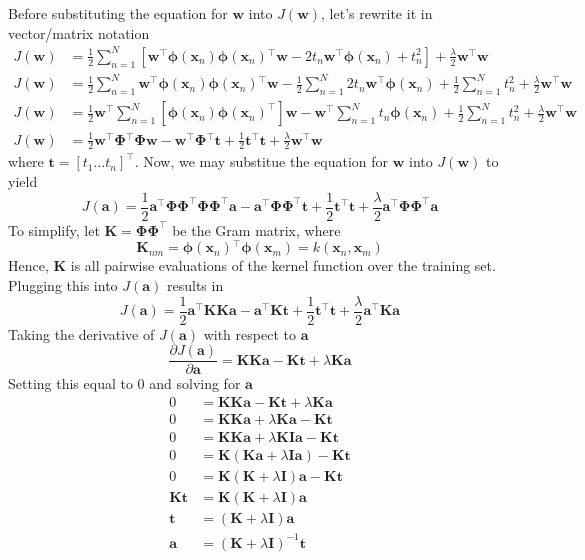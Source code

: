 \documentclass[12pt]{article}
\newcommand{\w}{\mathbf{w}}
\newcommand{\tVec}{\mathbf{t}}
\newcommand{\aVec}{\mathbf{a}}
\newcommand{\sumN}{\sum \limits_{n=1}^N}
\newcommand{\Ja}{J\left(\aVec{}\right)}
\newcommand{\Jw}{J\left(\w{}\right)}
\newcommand{\wTransW}{\w{}^\top\w{}}
\newcommand{\tTransT}{\tVec{}^\top\tVec{}}
\newcommand{\dJda}{\frac{\partial \Ja{}}{\partial \aVec{}}}
\newcommand{\phiXn}{\mathbf{\phi}\left(\mathbf{x}_n\right)}
\newcommand{\phiXm}{\mathbf{\phi}\left(\mathbf{x}_m\right)}
\newcommand{\wTransPhi}{\w{}^\top\phiXn{}}
\newcommand{\phiTransW}{\phiXn{}^\top\w{}}
\newcommand{\PhiMat}{\mathbf{\Phi}}
\newcommand{\PhiPhiTrans}{\PhiMat\PhiMat^\top}
\newcommand{\K}{\mathbf{K}}
\newcommand{\I}{\mathbf{I}}
\begin{document}
Before substituting the equation for $\w{}$ into $\Jw{}$, let's rewrite it in
vector/matrix notation
%
\begin{align*}
  \Jw{} &= \frac{1}{2}\sumN{}
  \left[\wTransPhi{}\phiTransW{} - 2t_n\wTransPhi{} + t_n^2\right] +
  \frac{\lambda}{2}\wTransW{}\\
  \Jw{} &= \frac{1}{2}\sumN{}\wTransPhi{}\phiTransW{} -
  \frac{1}{2}\sumN{}2t_n\wTransPhi{} +
  \frac{1}{2}\sumN{}t_n^2 +
  \frac{\lambda}{2}\wTransW{}\\
  \Jw{} &= \frac{1}{2}\w{}^\top\sumN{}\left[\phiXn{}\phiXn^\top\right]\w{} -
  \w{}^\top\sumN{}t_n\phiXn{} +
  \frac{1}{2}\sumN{}t_n^2 +
  \frac{\lambda}{2}\wTransW{}\\
  \Jw{} &= \frac{1}{2}\w{}^\top\PhiMat{}^\top\PhiMat{}\w{} -
  \w{}^\top\PhiMat{}^\top\tVec{} +
  \frac{1}{2}\tTransT{} +
  \frac{\lambda}{2}\wTransW{}
\end{align*}
%
where $\tVec{} = \left[t_1 \hdots t_n\right]^\top$. Now, we may substitue the
equation for $\w{}$ into $\Jw{}$ to yield
%
\begin{equation*}
\Ja{} = \frac{1}{2}\aVec{}^\top\PhiPhiTrans{}\PhiPhiTrans{}\aVec{} -
  \aVec{}^\top\PhiPhiTrans{}\tVec{} +
  \frac{1}{2}\tTransT{} +
  \frac{\lambda}{2}\aVec{}^\top\PhiPhiTrans{}\aVec{}
\end{equation*}
%
To simplify, let $\K{} = \PhiPhiTrans{}$ be the Gram matrix, where
%
\begin{equation*}
\K{}_{nm} = \phiXn{}^\top\phiXm{} = k\left(\mathbf{x}_n,\mathbf{x}_m\right)
\end{equation*}
%
Hence, $\K{}$ is all pairwise evaluations of the kernel function over the
training set. Plugging this into $\Ja{}$ results in
%
\begin{equation*}
  \Ja{} = \frac{1}{2}\aVec{}^\top\K{}\K{}\aVec{} -
  \aVec{}^\top\K{}\tVec{} +
  \frac{1}{2}\tTransT{} +
  \frac{\lambda}{2}\aVec{}^\top\K{}\aVec{}
\end{equation*}
%
Taking the derivative of $\Ja{}$ with respect to $\aVec{}$
\begin{equation*}
  \dJda = \K{}\K{}\aVec{} - \K{}\tVec{} + \lambda\K{}\aVec{}
\end{equation*}
%
Setting this equal to $0$ and solving for $\aVec{}$
\begin{align*}
  0 &= \K{}\K{}\aVec{} - \K{}\tVec{} + \lambda\K{}\aVec{}\\
  0 &= \K{}\K{}\aVec{} + \lambda\K{}\aVec{} - \K{}\tVec{}\\
  0 &= \K{}\K{}\aVec{} + \lambda\K{}\I{}\aVec{} - \K{}\tVec{}\\
  0 &= \K{}\left(\K{}\aVec{} + \lambda\I{}\aVec{}\right) - \K{}\tVec{}\\
  0 &= \K{}\left(\K{} + \lambda\I{}\right)\aVec{} - \K{}\tVec{}\\
  \K{}\tVec{} &= \K{}\left(\K{} + \lambda\I{}\right)\aVec{}\\
  \tVec{} &= \left(\K{} + \lambda\I{}\right)\aVec{}\\
  \aVec{} &= \left(\K{} + \lambda\I{}\right)^{-1}\tVec{}
\end{align*}
\end{document}
